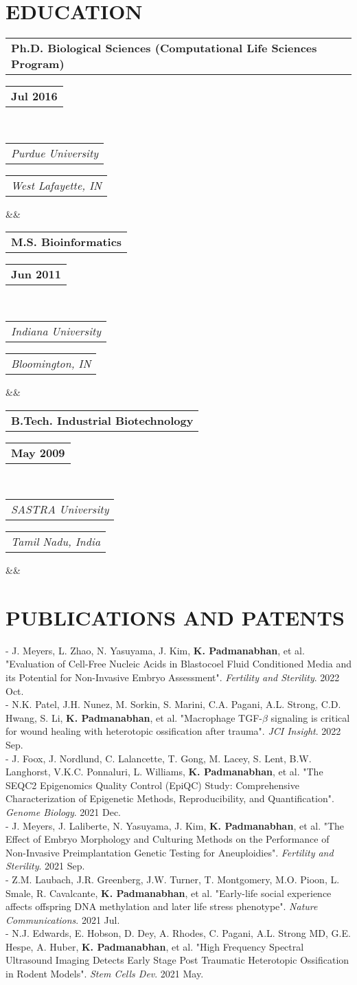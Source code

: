 \documentclass[11pt,letterpaper,sans]{moderncv}        %
\makeatletter
\newcommand*{\customcventry}[7][.25em]{
  \begin{tabular}{@{}l} 
    {\bfseries #4}
  \end{tabular}
  \hfill%
  \begin{tabular}{l@{}}
     {\bfseries #5}
  \end{tabular} \\
  \begin{tabular}{@{}l} 
    {\itshape #3}
  \end{tabular}
  \hfill%
  \begin{tabular}{l@{}}
     {\itshape #2}
  \end{tabular}
  \ifx&#7&%
  \else{\\%
    \begin{minipage}{\maincolumnwidth}%
      \small#7%
    \end{minipage}}\fi%
  \par\addvspace{#1}}
\makeatother
\begin{document}
{{\section{EDUCATION}
{\customcventry{West Lafayette, IN}{Purdue University}{Ph.D. Biological Sciences (Computational Life Sciences Program)}{Jul 2016}{}{}}
{\customcventry{Bloomington, IN}{Indiana University}{M.S. Bioinformatics}{Jun 2011}{}{}}
{\customcventry{Tamil Nadu, India}{SASTRA University}{B.Tech. Industrial Biotechnology}{May 2009}{}{}}

\section{PUBLICATIONS AND PATENTS}
\begin{minipage}{\maincolumnwidth}%
	\small{
	- J. Meyers, L. Zhao, N. Yasuyama, J. Kim, \textbf{K. Padmanabhan}, et al. "Evaluation of Cell-Free Nucleic Acids in Blastocoel Fluid Conditioned Media and its Potential for Non-Invasive Embryo Assessment". \textit{Fertility and Sterility}. 2022 Oct.\\
	- N.K. Patel, J.H. Nunez, M. Sorkin, S. Marini, C.A. Pagani, A.L. Strong, C.D. Hwang, S. Li, \textbf{K. Padmanabhan}, et al. "Macrophage TGF-$\beta$ signaling is critical for wound healing with heterotopic ossification after trauma".  \textit{JCI Insight}. 2022 Sep.\\
	- J. Foox, J. Nordlund, C. Lalancette, T. Gong, M. Lacey, S. Lent, B.W. Langhorst, V.K.C. Ponnaluri, L. Williams, \textbf{K. Padmanabhan}, et al. "The SEQC2 Epigenomics Quality Control (EpiQC) Study: Comprehensive Characterization of Epigenetic Methods, Reproducibility, and Quantification".  \textit{Genome Biology}. 2021 Dec.\\
	- J. Meyers, J. Laliberte, N. Yasuyama, J. Kim, \textbf{K. Padmanabhan}, et al. "The Effect of Embryo Morphology and Culturing Methods on the Performance of Non-Invasive Preimplantation Genetic Testing for Aneuploidies". \textit{Fertility and Sterility}. 2021 Sep.\\
	- Z.M. Laubach, J.R. Greenberg, J.W. Turner, T. Montgomery, M.O. Pioon, L. Smale, R. Cavalcante, \textbf{K. Padmanabhan}, et al. "Early-life social experience affects offspring DNA methylation and later life stress phenotype". \textit{Nature Communications}. 2021 Jul.\\
	- N.J. Edwards, E. Hobson, D. Dey, A. Rhodes, C. Pagani, A.L. Strong MD, G.E. Hespe, A. Huber, \textbf{K. Padmanabhan}, et al. "High Frequency Spectral Ultrasound Imaging Detects Early Stage Post Traumatic Heterotopic Ossification in Rodent Models". \textit{Stem Cells Dev}. 2021 May.\\
}
\end{minipage}}}
\end{document}
